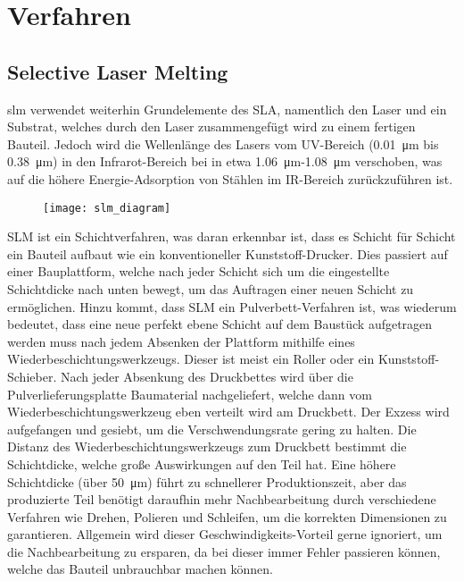 \documentclass[../main.tex]{subfiles}
\begin{document}
\section{Verfahren}
\subsection{Selective Laser Melting}
\acrfull{slm} verwendet weiterhin Grundelemente des SLA, namentlich den Laser und ein Substrat, welches durch den Laser zusammengefügt wird zu einem fertigen Bauteil. 
Jedoch wird die Wellenlänge des Lasers vom UV-Bereich (\qty{0.01}{\micro\meter} bis \qty{0.38}{\micro\meter}) in den Infrarot-Bereich bei in etwa \qty{1.06}{\micro\meter}-\qty{1.08}{\micro\meter} verschoben, was auf die höhere Energie-Adsorption von Stählen im IR-Bereich zurückzuführen ist.\parencite{3FAKTUR_1}
\begin{figure}[h]
\begin{center}
	\texttt{[image: slm\_diagram]}
	\label{img:slm_diagram}
\end{center}
\end{figure}	
SLM ist ein Schichtverfahren, was daran erkennbar ist, dass es Schicht für Schicht ein Bauteil aufbaut wie ein konventioneller Kunststoff-Drucker. Dies passiert auf einer Bauplattform, welche nach jeder Schicht sich um die eingestellte Schichtdicke nach unten bewegt, um das Auftragen einer neuen Schicht zu ermöglichen. 
Hinzu kommt, dass SLM ein Pulverbett-Verfahren ist, was wiederum bedeutet, dass eine neue perfekt ebene Schicht auf dem Baustück aufgetragen werden muss nach jedem Absenken der Plattform mithilfe eines Wiederbeschichtungswerkzeugs.
Dieser ist meist ein Roller oder ein Kunststoff-Schieber. Nach jeder Absenkung des Druckbettes wird über die Pulverlieferungsplatte Baumaterial nachgeliefert, welche dann vom Wiederbeschichtungswerkzeug eben verteilt wird am Druckbett. Der Exzess wird aufgefangen und gesiebt, um die Verschwendungsrate gering zu halten.  
Die Distanz des Wiederbeschichtungswerkzeugs zum Druckbett bestimmt die Schichtdicke, welche große Auswirkungen auf den Teil hat. Eine höhere Schichtdicke (über \qty{50}{\micro\meter}) führt zu schnellerer Produktionszeit, aber das produzierte Teil benötigt daraufhin mehr Nachbearbeitung durch verschiedene Verfahren wie Drehen, Polieren und Schleifen, um die korrekten Dimensionen zu garantieren. Allgemein wird dieser Geschwindigkeits-Vorteil gerne ignoriert, um die Nachbearbeitung zu ersparen, da bei dieser immer Fehler passieren können, welche das Bauteil unbrauchbar machen können.
\end{document}
